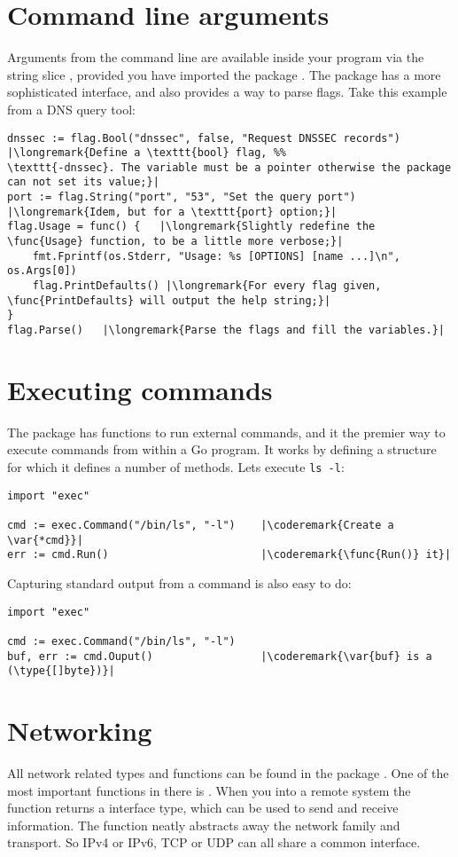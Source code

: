 \section{Command line arguments}
\label{sec:option parsing}
Arguments from the command line are available inside your program via
the string slice , provided you have imported the package
. The  package has a more sophisticated
interface, and also provides a way to parse flags. Take this example
from a DNS query tool:
\begin{lstlisting}
dnssec := flag.Bool("dnssec", false, "Request DNSSEC records") |\longremark{Define a \texttt{bool} flag, %%
\texttt{-dnssec}. The variable must be a pointer otherwise the package can not set its value;}|
port := flag.String("port", "53", "Set the query port")      |\longremark{Idem, but for a \texttt{port} option;}|
flag.Usage = func() {   |\longremark{Slightly redefine the \func{Usage} function, to be a little more verbose;}|
    fmt.Fprintf(os.Stderr, "Usage: %s [OPTIONS] [name ...]\n", os.Args[0])
    flag.PrintDefaults() |\longremark{For every flag given, \func{PrintDefaults} will output the help string;}|
}
flag.Parse()   |\longremark{Parse the flags and fill the variables.}|
\end{lstlisting}
\showremarks

\section{Executing commands}
The  package has functions to run external commands, and it the premier way to
execute commands from within a Go program. It works by defining a  structure for which it
defines a number of methods.
Lets execute \verb|ls -l|:
\begin{lstlisting}
import "exec"

cmd := exec.Command("/bin/ls", "-l")    |\coderemark{Create a \var{*cmd}}|
err := cmd.Run()                        |\coderemark{\func{Run()} it}|
\end{lstlisting}
Capturing standard output from a command is also easy to do:
\begin{lstlisting}
import "exec"

cmd := exec.Command("/bin/ls", "-l")
buf, err := cmd.Ouput()                 |\coderemark{\var{buf} is a (\type{[]byte})}|
\end{lstlisting}

\section{Networking}
All network related types and functions can be found in the package . One of the
most important functions in there is . When you 
into a remote system the function returns a  interface type, which can be used
to send and receive information. The function  neatly abstracts away the network
family and transport. So IPv4 or IPv6, TCP or UDP can all share a common interface. 

